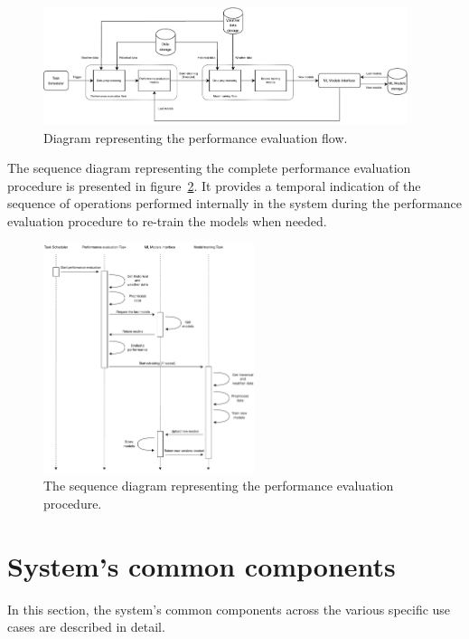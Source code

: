 \begin{figure}[H]
\centering
\includegraphics[width=0.95\textwidth]{images/architecture_scheduler_flow}
\caption{Diagram representing the performance evaluation flow.}
\label{fig:schedulerflow}
\end{figure}

The sequence diagram representing the complete performance evaluation procedure is presented in figure~\ref{fig:schedulersequence}.
It provides a temporal indication of the sequence of operations performed internally in the system during the performance evaluation procedure to re-train the models when needed.

\begin{figure}[H]
\centering
\includegraphics[width=0.55\textwidth]{images/architecture_scheduler_sequence}
\caption{The sequence diagram representing the performance evaluation procedure.}
\label{fig:schedulersequence}
\end{figure}


\section{System's common components}
\label{sec:components}
\vspace{0.2 cm}

In this section, the system's common components across the various specific use cases are described in detail.

